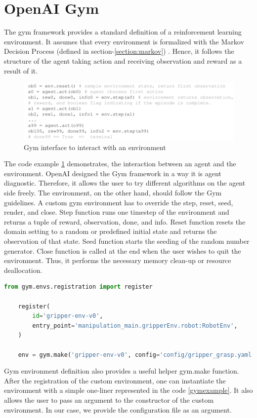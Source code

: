 \section{OpenAI Gym}

The gym framework provides a standard definition of a reinforcement learning environment. It assumes that every environment is formalized with the Markov Decision Process (defined in section-\ref{section:markov}) \cite{OpenAIgym}. Hence, it follows the structure of the agent taking action and receiving observation and reward as a result of it.

\begin{figure}[htbp] 
    \centering
    \includegraphics[width=1.0\textwidth]{figures/gyminterface}
    \caption{Gym interface to interact with an environment}
    \label{fig:gyminterface}
\end{figure}


The code example \ref{fig:gyminterface} demonstrates, the interaction between an agent and the environment. OpenAI designed the Gym framework in a way it is agent diagnostic. Therefore, it allows the user to try different algorithms on the agent side freely. The environment, on the other hand, should follow the Gym guidelines. A custom gym environment has to override the step, reset, seed, render, and close. Step function runs one timestep of the environment and returns a tuple of reward, observation, done, and info. Reset function resets the domain setting to a random or predefined initial state and returns the observation of that state. Seed function starts the seeding of the random number generator. Close function is called at the end when the user wishes to quit the environment. Thus, it performs the necessary memory clean-up or resource deallocation.

\begin{lstlisting}[language=Python, caption=Gym environment example instantiation, label=gymexample]
    from gym.envs.registration import register

    register(
        id='gripper-env-v0',
        entry_point='manipulation_main.gripperEnv.robot:RobotEnv',
    )

    env = gym.make('gripper-env-v0', config='config/gripper_grasp.yaml')
\end{lstlisting}

Gym environment definition also provides a useful helper gym.make function. After the registration of the custom environment, one can instantiate the environment with a simple one-liner represented in the code \ref{gymexample}. It also allows the user to pass an argument to the constructor of the custom environment. In our case, we provide the configuration file as an argument.